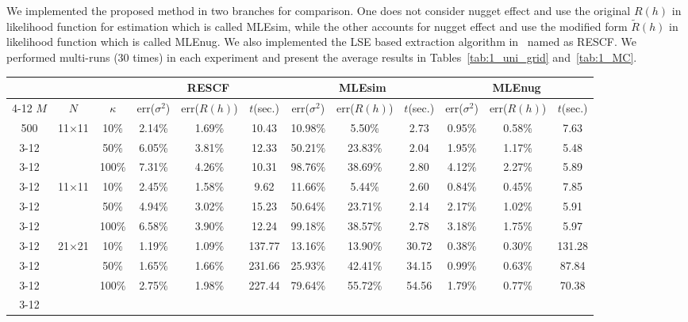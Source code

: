 \documentclass[referee]{ieice}
\begin{document}
We implemented the proposed method in two branches for comparison. One does not consider nugget effect
and use the original $R(h)$ in likelihood function for estimation which is called MLEsim,
while the other accounts for nugget effect and use the modified form $\tilde{R}(h)$ in likelihood function
which is called MLEnug. We also implemented the LSE based
extraction algorithm in~\cite{Xiong07} named as RESCF.
We performed multi-runs (30 times)
in each experiment and present the average results in Tables~\ref{tab:1_uni_grid} and~\ref{tab:1_MC}.
\begin{table*}[tb]
  \caption{Results of spatial correlation extraction with uniform gridding sampling scheme} \label{tab:1_uni_grid}
{\small
    \begin{center}
      \begin{tabular}{|c|c|c|c|c|c|c|c|c|c|c|c|} \hline
               & & & \multicolumn{3}{|c|}{RESCF} & \multicolumn{3}{|c|}{MLEsim} & \multicolumn{3}{|c|}{MLEnug} \\ \cline{4-12}
         $M$  & $N$ & $\kappa$ & err($\sigma^2$) & err($R(h)$) & $t$(sec.) & err($\sigma^2$) & err($R(h)$) & $t$(sec.) & err($\sigma^2$) & err($R(h)$) & $t$(sec.) \\ \hline
        500 & 11$\times$11 & 10\% & 2.14\% & 1.69\% & 10.43 & 10.98\% & 5.50\% & 2.73 & 0.95\% & 0.58\% & 7.63 \\ \cline{3-12}
              & & 50\% & 6.05\% & 3.81\% & 12.33 & 50.21\% & 23.83\% & 2.04 & 1.95\% & 1.17\% & 5.48 \\ \cline{3-12}
              & & 100\% & 7.31\% & 4.26\% & 10.31 & 98.76\% & 38.69\% & 2.80 & 4.12\% & 2.27\% & 5.89 \\ \cline{3-12} \hline
        1000 & 11$\times$11 & 10\% & 2.45\% & 1.58\% & 9.62 & 11.66\% & 5.44\% & 2.60 & 0.84\% & 0.45\% & 7.85 \\ \cline{3-12}
              & & 50\% & 4.94\% & 3.02\% & 15.23 & 50.64\% & 23.71\% & 2.14 & 2.17\% & 1.02\% & 5.91 \\ \cline{3-12}
              & & 100\% & 6.58\% & 3.90\% & 12.24 & 99.18\% & 38.57\% & 2.78 & 3.18\% & 1.75\% & 5.97 \\ \cline{3-12} \hline
        500 & 21$\times$21 & 10\% & 1.19\% & 1.09\% & 137.77 & 13.16\% & 13.90\% & 30.72 & 0.38\% & 0.30\% & 131.28 \\ \cline{3-12}
              & & 50\% & 1.65\% & 1.66\% & 231.66 & 25.93\% & 42.41\% & 34.15 & 0.99\% & 0.63\% & 87.84 \\ \cline{3-12}
              & & 100\% & 2.75\% & 1.98\% & 227.44 & 79.64\% & 55.72\% & 54.56 & 1.79\% & 0.77\% & 70.38 \\ \cline{3-12} \hline

\end{tabular}
\end{center}}
\end{table*}
\end{document}
